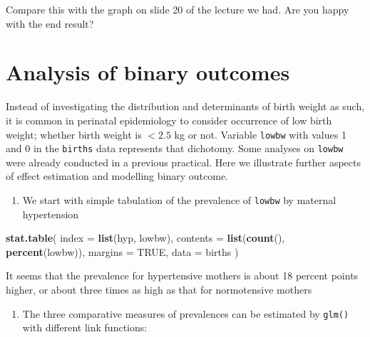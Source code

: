 \documentclass[
]{book}
\newenvironment{Shaded}{\begin{snugshade}}{\end{snugshade}}
\newcommand{\AttributeTok}[1]{\textcolor[rgb]{0.13,0.29,0.53}{#1}}
\newcommand{\ConstantTok}[1]{\textcolor[rgb]{0.56,0.35,0.01}{#1}}
\newcommand{\FunctionTok}[1]{\textcolor[rgb]{0.13,0.29,0.53}{\textbf{#1}}}
\newcommand{\NormalTok}[1]{#1}
\providecommand{\tightlist}{%
  \setlength{\itemsep}{0pt}\setlength{\parskip}{0pt}}
\begin{document}
Compare this with the graph on slide 20 of the lecture we had.
Are you happy with the end result?

\section{Analysis of binary outcomes}\label{analysis-of-binary-outcomes}

Instead of investigating the distribution and determinants
of birth weight as such, it is common in perinatal
epidemiology to consider
occurrence of low birth weight; whether birth weight is
\(< 2.5\) kg or not. Variable \texttt{lowbw} with values 1 and 0
in the \texttt{births} data represents that dichotomy.
Some analyses on \texttt{lowbw} were already conducted
in a previous practical. Here we illustrate further
aspects of effect estimation
and modelling binary outcome.

\begin{enumerate}
\def\labelenumi{\arabic{enumi}.}
\tightlist
\item
  We start with simple tabulation
  of the prevalence of \texttt{lowbw} by maternal hypertension
\end{enumerate}

\begin{Shaded}
\begin{Highlighting}[]
\FunctionTok{stat.table}\NormalTok{(}
  \AttributeTok{index =} \FunctionTok{list}\NormalTok{(hyp, lowbw),}
  \AttributeTok{contents =} \FunctionTok{list}\NormalTok{(}\FunctionTok{count}\NormalTok{(), }\FunctionTok{percent}\NormalTok{(lowbw)),}
  \AttributeTok{margins =} \ConstantTok{TRUE}\NormalTok{, }\AttributeTok{data =}\NormalTok{ births}
\NormalTok{)}
\end{Highlighting}
\end{Shaded}

It seems that the prevalence for hypertensive mothers
is about 18 percent points higher,
or about three times as high as that for normotensive mothers

\begin{enumerate}
\def\labelenumi{\arabic{enumi}.}
\setcounter{enumi}{1}
\tightlist
\item
  The three comparative measures of prevalences can be
  estimated by \texttt{glm()} with different link functions:
\end{enumerate}
\end{document}
